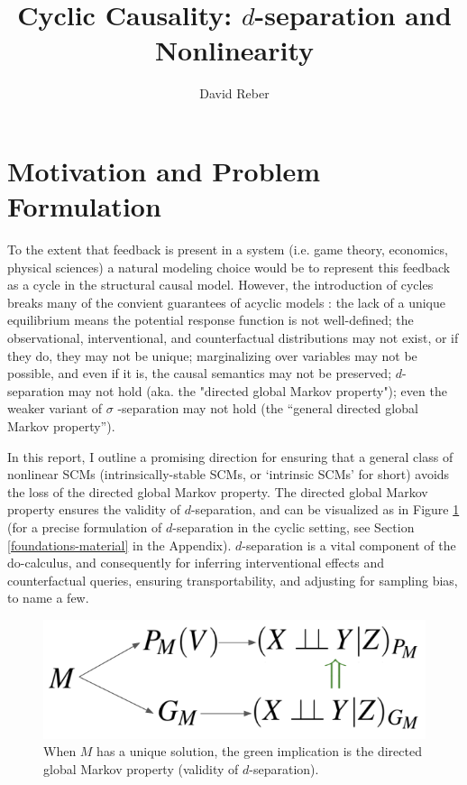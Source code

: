 \documentclass[letterpaper,10pt]{article}
\begin{document}
\title{Cyclic Causality: $d$-separation and Nonlinearity}

\author{David Reber}
\address{Columbia University}




\section{Motivation and Problem Formulation}

To the extent that feedback is present in a system (i.e. game theory, economics, physical sciences) a natural modeling choice would be to represent this feedback as a cycle in the structural causal model. However, the introduction of cycles breaks many of the convient guarantees of acyclic models \cite{Foundations}: the lack of a unique equilibrium means the potential response function is not well-defined; the observational, interventional, and counterfactual distributions may not exist, or if they do, they may not be unique; marginalizing over variables may not be possible, and even if it is, the causal semantics may not be preserved; $d$-separation may not hold (aka. the "directed global Markov property"); even the weaker variant of $\sigma$ -separation may not hold (the “general directed global Markov property”).

In this report, I outline a promising direction for ensuring that a general class of nonlinear SCMs (intrinsically-stable SCMs, or `intrinsic SCMs' for short) avoids the loss of the directed global Markov property.
The directed global Markov property ensures the validity of $d$-separation, and can be visualized as in Figure \ref{fig:dsep-Markov-flow} (for a precise formulation of $d$-separation in the cyclic setting, see Section \ref{foundations-material} in the Appendix).
$d$-separation is a vital component of the do-calculus, and consequently for inferring interventional effects and counterfactual queries, ensuring transportability, and adjusting for sampling bias, to name a few.

\begin{figure}
\centering
\includegraphics[width=.4\linewidth]{pics/my_own/dsep_Markov_flow.png}
\caption{When $M$ has a unique solution, the green implication is the directed global Markov property (validity of $d$-separation).}
\label{fig:dsep-Markov-flow}
\end{figure}
\end{document}
